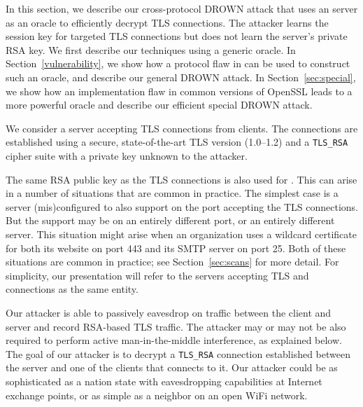 In this section, we describe our cross-protocol DROWN attack that uses an
\ssltwo server as an oracle to efficiently decrypt TLS connections.
The attacker learns the session key for targeted TLS connections
but does not learn the server's private RSA key. We first describe our techniques
using a generic \ssltwo oracle. In Section~\ref{vulnerability}, we show how a
protocol flaw in \ssltwo can be used to construct such an oracle, and describe
our general DROWN attack. In Section~\ref{sec:special}, we show how an
implementation flaw in common versions of OpenSSL leads to a more powerful
oracle and describe our efficient special DROWN attack.


\label{sec:attack-scenario}

We consider a server accepting TLS connections from clients. The connections are established using a secure, state-of-the-art TLS version (1.0--1.2) and a \texttt{TLS\_RSA} cipher suite with a private key unknown to the attacker.

The same RSA public key as the TLS connections is also used for \ssltwo. 
This can arise in a number of situations that are common in practice.  The simplest case is a server (mis)configured to also support \ssltwo on the port accepting the TLS connections.  But the \ssltwo support may be on an entirely different port, or an entirely different server.
This situation might arise when an organization uses a wildcard certificate for both its website on port 443 and its SMTP server on port 25.  Both of these situations are common in practice; see Section~\ref{sec:scans} for more detail.  
\fi
For simplicity, our presentation will refer to the servers accepting TLS and \ssltwo connections as the same entity.

Our attacker is able to passively eavesdrop on traffic between the client and
server and record RSA-based TLS traffic.
The attacker may or may not be also required to perform active man-in-the-middle
interference, as explained below.
\ifext
The goal of our attacker is to decrypt a \texttt{TLS\_RSA} connection established between the server and one of the clients that connects to it.
Our attacker could be as sophisticated as a nation state with eavesdropping capabilities at Internet exchange points, or as simple as a neighbor on an open WiFi network.
\fi

